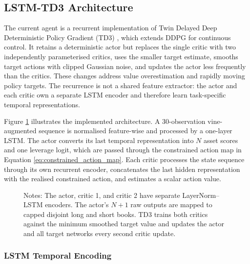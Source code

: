 \subsection{LSTM-TD3 Architecture}
\label{subsec:3_lstm_td3}

The current agent is a recurrent implementation of Twin Delayed Deep Deterministic Policy Gradient (TD3) \cite{fujimoto_addressing_2018}, which extends DDPG \cite{lillicrap_continuous_2015} for continuous control. It retains a deterministic actor but replaces the single critic with two independently parameterised critics, uses the smaller target estimate, smooths target actions with clipped Gaussian noise, and updates the actor less frequently than the critics. These changes address value overestimation and rapidly moving policy targets. The recurrence is not a shared feature extractor: the actor and each critic own a separate LSTM encoder and therefore learn task-specific temporal representations.

Figure \ref{fig:lstm_td3_architecture} illustrates the implemented architecture. A 30-observation vine-augmented sequence is normalised feature-wise and processed by a one-layer LSTM. The actor converts its last temporal representation into $N$ asset scores and one leverage logit, which are passed through the constrained action map in Equation \eqref{eq:constrained_action_map}. Each critic processes the state sequence through its own recurrent encoder, concatenates the last hidden representation with the realised constrained action, and estimates a scalar action value.

\begin{figure}[H]
\centering

\caption{Implemented LSTM-TD3 Architecture and Update Loop}
\label{fig:lstm_td3_architecture}
\caption*{\footnotesize Notes: The actor, critic 1, and critic 2 have separate LayerNorm--LSTM encoders. The actor's $N+1$ raw outputs are mapped to capped disjoint long and short books. TD3 trains both critics against the minimum smoothed target value and updates the actor and all target networks every second critic update.}
\end{figure}

\subsubsection{LSTM Temporal Encoding}
\label{subsubsec:3_lstm_temporal_encoding}

